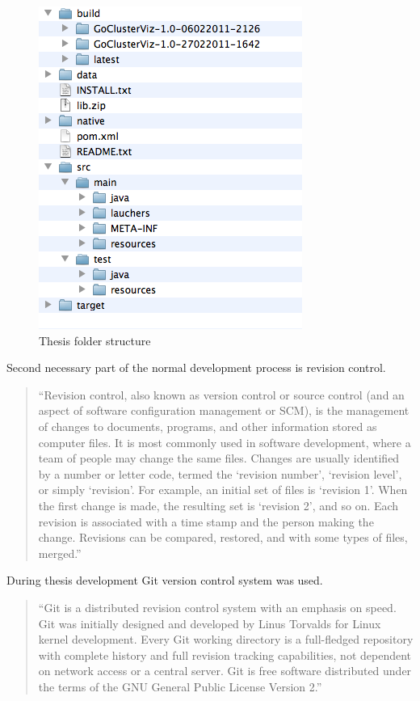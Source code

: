\begin{figure}[h!]
\centering
\includegraphics[scale=0.7]{pictures/thesis_folder_structure.png}
\caption{Thesis folder structure}
\label{fig:THESIS_FOLDER_STRUCTURE}
\end{figure}

Second necessary part of the normal development process is revision control.

\begin{quotation}
``Revision control, also known as version control or source control (and an aspect of software configuration management or SCM),
is the management of changes to documents, programs, and other information stored as computer files.
It is most commonly used in software development, where a team of people may change the same files.
Changes are usually identified by a number or letter code, termed the `revision number', `revision level', or simply `revision'.
For example, an initial set of files is `revision 1'. When the first change is made, the resulting set is `revision 2', and so on.
Each revision is associated with a time stamp and the person making the change. Revisions can be compared,
restored, and with some types of files, merged.''~\cite{REVISION_CONTROL}
\end{quotation}

During thesis development Git version control system was used.

\begin{quotation}
``Git is a distributed revision control system with an emphasis on speed.
Git was initially designed and developed by Linus Torvalds for Linux kernel development.
Every Git working directory is a full-fledged repository with complete history and full revision tracking capabilities,
not dependent on network access or a central server. Git is free software distributed under the terms of the
GNU General Public License Version 2.''~\cite{GIT}
\end{quotation}

